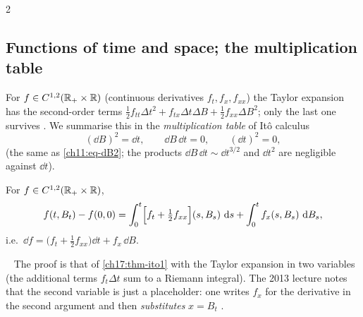 \begin{paracol}{2}
\subsection{Functions of time and space; the multiplication table}\label{ch17:sec-lemma2}
For $f\in C^{1,2}(\mathbb{R}_+\times\mathbb{R})$ (continuous derivatives $f_t,f_x,f_{xx}$) the Taylor expansion has the second-order terms
$\tfrac12f_{tt}\Delta t^2+f_{tx}\Delta t\Delta B+\tfrac12f_{xx}\Delta B^2$; only the last one survives
. We summarise this in the
\emph{multiplication table} of It\^o calculus
\begin{equation}\label{ch17:eq-table}
  (\dd B)^2=\dd t,\qquad \dd B\,\dd t=0,\qquad (\dd t)^2=0 ,
\end{equation}
(the same as \cref{ch11:eq-dB2}; the products $\dd B\,\dd t\sim\dd t^{3/2}$ and $\dd t^2$ are negligible against $\dd t$).

\begin{theorem}\label{ch17:thm-ito2}
For $f\in C^{1,2}(\mathbb{R}_+\times\mathbb{R})$,
\begin{equation}\label{ch17:eq-ito2}
  f(t,B_t)-f(0,0)=\int_0^t\Bigl[f_t+\tfrac12f_{xx}\Bigr](s,B_s)\,\,\mathrm{d} s+\int_0^tf_x(s,B_s)\,\,\mathrm{d} B_s ,
\end{equation}
i.e.\ $\dd f=\bigl(f_t+\tfrac12f_{xx}\bigr)\dd t+f_x\,\dd B$.
\end{theorem}
\ \noindent
The proof is that of \cref{ch17:thm-ito1} with the Taylor expansion in two variables (the additional terms $f_t\Delta t$ sum to a Riemann integral). The 2013 lecture notes that the second
variable is just a placeholder: one writes $f_x$ for the derivative in the second argument and then \emph{substitutes} $x=B_t$ .


\end{paracol}

